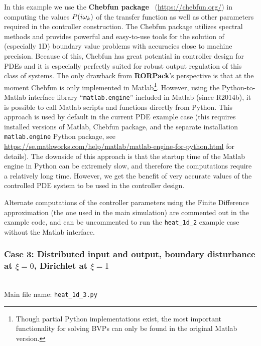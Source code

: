 \documentclass[11pt, a4paper]{amsart}
\theoremstyle{definition}
\numberwithin{equation}{section}
\newcommand{\RORname}{\textbf{RORPack}}
\begin{document}
In this example we use the \textbf{\mbox{Chebfun} package}~\cite{DriHal14book,Tre13book} (\href{https://chebfun.org/}{https://chebfun.org/}) in computing the values $P(i\omega_k)$ of the transfer function as well as other parameters required in the controller construction. The Chebfun package utilizes spectral methods and provides powerful and easy-to-use tools for the solution of (especially 1D) boundary value problems with accuracies close to machine precision.
Because of this, Chebfun has great potential in controller design for PDEs and it is especially perfectly suited for robust output regulation of this class of systems.
The only drawback from \RORname's perspective is that at the moment Chebfun is only implemented in Matlab\footnote{Though partial Python implementations exist, the most important functionality for solving BVPs can only be found in the original Matlab version.}. However, using the Python-to-Matlab interface library ``\texttt{matlab.engine}'' included in Matlab (since R2014b), it is possible to call Matlab scripts and functions directly from Python. This approach is used by default in the current PDE example case (this requires installed versions of Matlab, Chebfun package, and the separate installation \texttt{matlab.engine} Python package, see \href{https://se.mathworks.com/help/matlab/matlab-engine-for-python.html}{https://se.mathworks.com/help/matlab/matlab-engine-for-python.html} for details). 
The downside of this approach is that the startup time of the Matlab engine in Python can be extremely slow, and therefore the computations require a relatively long time. However, we get the benefit of very accurate values of the controlled PDE system to be used in the controller design.

Alternate computations of the controller parameters using the Finite Difference approximation (the one used in the main simulation) are commented out in the example code, and can be uncommented to run the \texttt{heat\_1d\_2} example case without the Matlab interface.


\medskip

\subsubsection*{Case 3: Distributed input and output, boundary disturbance at $\xi = 0$, Dirichlet at $\xi = 1$}
\label{sec:Heat1D3}
~\\[-1ex]

  \noindent Main file name: \texttt{heat\_1d\_3.py}
\end{document}
